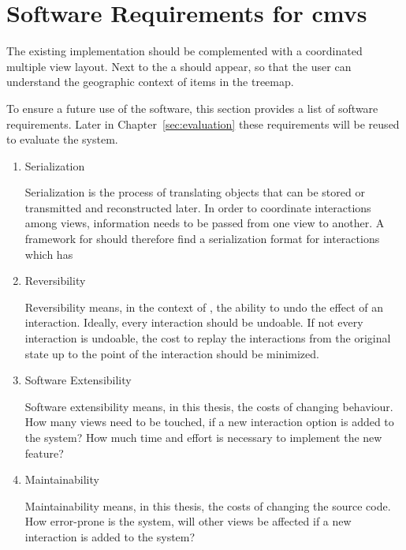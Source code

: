 \section{Software Requirements for \gls{cmv}s}\label{sec:analysis:requirements}
The existing implementation should be complemented with a coordinated multiple view layout.
Next to the \tmap{} a \gv{} should appear, so that the user can understand the geographic context of items in the treemap.

To ensure a future use of the software, this section provides a list of software requirements.
Later in Chapter~\ref{sec:evaluation} these requirements will be reused to evaluate the system.

\begin{enumerate}
  \item Serialization

    Serialization is the process of translating objects that can be stored or transmitted and reconstructed later.
    In order to coordinate interactions among views, information needs to be passed from one view to another.
    A framework for \cmvs{} should therefore find a serialization format for interactions which has

  \item Reversibility

  Reversibility means, in the context of \cmvs{}, the ability to undo the effect of an interaction.
  Ideally, every interaction should be undoable.
  If not every interaction is undoable, the cost to replay the interactions from the original state up to the point of the interaction should be minimized.

\item Software Extensibility

  Software extensibility means, in this thesis, the costs of changing behaviour.
  How many views need to be touched, if a new interaction option is added to the system?
  How much time and effort is necessary to implement the new feature?

\item Maintainability

  Maintainability means, in this thesis, the costs of changing the source code.
  How error-prone is the system, will other views be affected if a new interaction is added to the system?

\end{enumerate}



